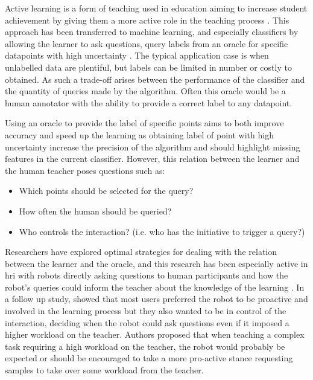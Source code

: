 Active learning is a form of teaching used in education aiming to increase student achievement by giving them a more active role in the teaching process \citep{johnson1991active}. This approach has been transferred to machine learning, and especially classifiers by allowing the learner to ask questions, query labels from an oracle for specific datapoints with high uncertainty \citep{settles2012active}. The typical application case is when unlabelled data are plentiful, but labels can be limited in number or costly to obtained. As such a trade-off arises between the performance of the classifier and the quantity of queries made by the algorithm. Often this oracle would be a human annotator with the ability to provide a correct label to any datapoint.

Using an oracle to provide the label of specific points aims to both improve accuracy and speed up the learning as obtaining label of point with high uncertainty increase the precision of the algorithm and should highlight missing features in the current classifier. However, this relation between the learner and the human teacher poses questions such as: 
\begin{itemize}
	\item Which points should be selected for the query?
	\item How often the human should be queried?
	\item Who controls the interaction? (i.e. who has the initiative to trigger a query?)
\end{itemize}

Researchers have explored optimal strategies for dealing with the relation between the learner and the oracle, and this research has been especially active in \gls{hri} with robots directly asking questions to human participants and how the robot's queries could inform the teacher about the knowledge of the learning \citep{chao2010transparent}. In a follow up study, \cite{cakmak2010designing} showed that most users preferred the robot to be proactive and involved in the learning process but they also wanted to be in control of the interaction, deciding when the robot could ask questions even if it imposed a higher workload on the teacher. Authors proposed that when teaching a complex task requiring a high workload on the teacher, the robot would probably be expected or should be encouraged to take a more pro-active stance requesting samples to take over some workload from the teacher.

